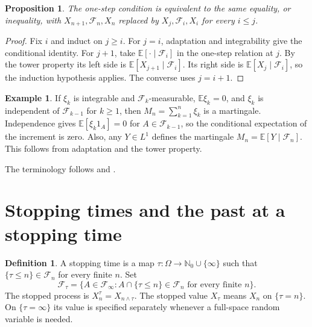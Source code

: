 \documentclass[11pt,oneside,openany]{book}
\theoremstyle{plain}
\newtheorem{proposition}[theorem]{Proposition}
\theoremstyle{definition}
\newtheorem{definition}[theorem]{Definition}
\newtheorem{example}[theorem]{Example}
\theoremstyle{remark}
\begin{document}
\begin{proposition}
The one-step condition is equivalent to the same equality, or
inequality, with \(X_{n+1},\mathcal F_n,X_n\) replaced by
\(X_j,\mathcal F_i,X_i\) for every \(i\le j\).
\end{proposition}
\begin{proof}
Fix \(i\) and induct on \(j\ge i\). For \(j=i\), adaptation and
integrability give the conditional identity. For \(j+1\), take
\(\mathbb E[\cdot\mid\mathcal F_i]\) in the one-step relation at
\(j\). By the tower property its left side is
\(\mathbb E[X_{j+1}\mid\mathcal F_i]\). Its right side is
\(\mathbb E[X_j\mid\mathcal F_i]\), so the induction hypothesis
applies. The converse uses \(j=i+1\).
\end{proof}

\begin{example}
If \(\xi_k\) is integrable and \(\mathcal F_k\)-measurable,
\(\mathbb E\xi_k=0\), and \(\xi_k\) is independent of
\(\mathcal F_{k-1}\) for \(k\ge1\), then
\(M_n=\sum_{k=1}^n\xi_k\) is a martingale. Independence gives
\(\mathbb E[\xi_k1_A]=0\) for \(A\in\mathcal F_{k-1}\), so the
conditional expectation of the increment is zero. Also, any
\(Y\in L^1\) defines the martingale \(M_n=\mathbb E[Y\mid\mathcal F_n]\).
This follows from adaptation and the tower property.
\end{example}

The terminology follows \cite[Sections 10.1--10.6]{Williams}
and \cite[Chapter 9]{Kallenberg}.

\section{Stopping times and the past at a stopping time}\label{p207:W02}

\begin{definition}
A stopping time is a map
\(\tau:\Omega\to\mathbb N_0\cup\{\infty\}\) such that
\(\{\tau\le n\}\in\mathcal F_n\) for every finite \(n\).
Set
\[
 \mathcal F_\tau=\{A\in\mathcal F_\infty:
                 A\cap\{\tau\le n\}\in\mathcal F_n
                 \text{ for every finite }n\}.
\]
The stopped process is \(X^\tau_n=X_{n\wedge\tau}\).
The stopped value \(X_\tau\) means \(X_n\) on \(\{\tau=n\}\).
On \(\{\tau=\infty\}\) its value is specified separately whenever a
full-space random variable is needed.
\end{definition}
\end{document}
